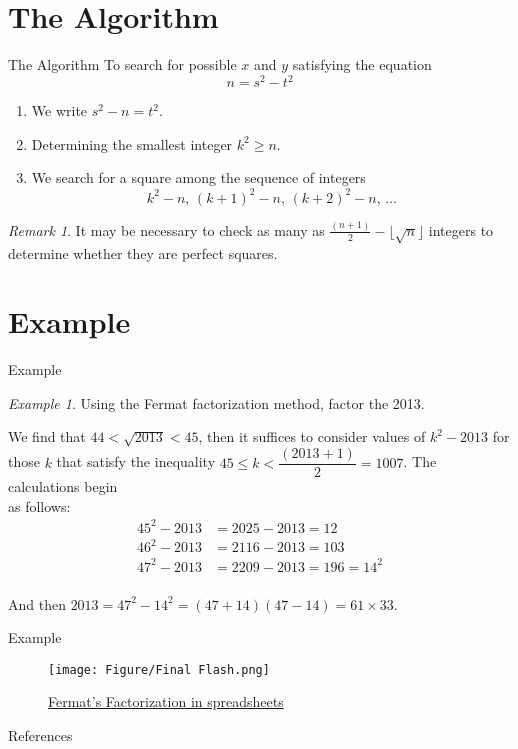 \documentclass[11pt,aspectratio=43,xcolor={dvipsnames},notheorems]{beamer}
\theoremstyle{definition}
\theoremstyle{plain}
\theoremstyle{remark}
\newtheorem{example}{Example}
\newtheorem*{remark}{Remark}
\begin{document}
\section{The Algorithm}
\begin{frame}{The Algorithm}
To search for possible $x$ and $y$ satisfying the equation 
$$n=s^2-t^2$$
\vspace{-1.5\baselineskip}
    \begin{enumerate}
        \item We write $s^2-n=t^2$.
        \item Determining the smallest integer $k^2\ge n$.
        \item We search for a square among the sequence of integers
        $$k^2-n,\,(k+1)^2-n,\,(k+2)^2-n,\,\ldots$$
    \end{enumerate}
\vspace{-0.5\baselineskip}
\begin{remark}
    It may be necessary to check as many as $\frac{(n+1)}{2}-\lfloor\sqrt{n}\rfloor$ integers to
determine whether they are perfect squares.
\end{remark}
\end{frame}
\section{Example}
\begin{frame}{Example}
    \begin{example}
        Using the Fermat factorization method, factor the 2013.
    \end{example}
    \pause
    We find that $44<\sqrt{2013}<45$, then it suffices to consider values of $k^2-2013$ for those $k$ that satisfy the inequality $45\le k<\dfrac{(2013+1)}{2}=1007$. The calculations begin \\as follows:
    \vspace{-0.5\baselineskip}
    \begin{align*}
        45^2-2013&=2025-2013=12\\
        46^2-2013&=2116-2013=103\\
        47^2-2013&=2209-2013=196=14^2
    \end{align*}\vspace{-1.5\baselineskip}\\
    And then $2013=47^2-14^2=(47+14)(47-14)=61\times 33.$
\end{frame}
\begin{frame}{Example}
\begin{figure}
    \centering
    \texttt{[image: Figure/Final Flash.png]}
    \caption{\href{https://docs.google.com/spreadsheets/d/1lInRBG6kQhh8O2SUpPTJ9NZ_3vZ3i2rk4NBUNAxkiGA/edit}{Fermat's Factorization in spreadsheets}}
\end{figure}
\end{frame}
\begin{frame}{References}
\def\newblock{}


\end{frame}
\end{document}
